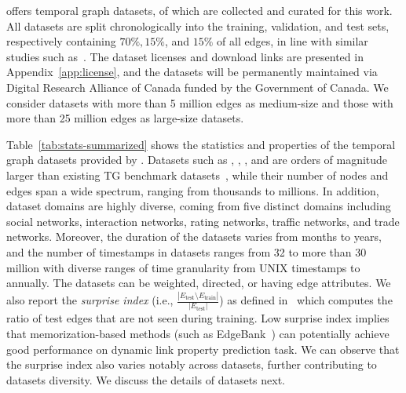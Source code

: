 \name offers  temporal graph datasets,  of which are collected and curated for this work. 
All datasets are split chronologically into the training, validation, and test sets, respectively containing $70\%, 15\%$, and $15\%$ of all edges, in line with similar studies such as~\cite{xu2020inductive,rossi2020temporal,wang2021tcl,jin2022neural,souza2022provably,luoneighborhood}. 
The dataset licenses and download links are presented in Appendix~\ref{app:license}, and the datasets will be permanently maintained via Digital Research Alliance of Canada funded by the Government of Canada. 
We consider datasets with more than 5 million edges as medium-size and those with more than 25 million edges as large-size datasets. 




Table~\ref{tab:stats-summarized} shows the statistics and properties of the temporal graph datasets provided by \name. 
Datasets such as \sky, \reddit, \coin, and \subreddit are orders of magnitude larger than existing TG benchmark datasets~\cite{rossi2020temporal,poursafaeitowards,kumar2019predicting}, while their number of nodes and edges span a wide spectrum, ranging from thousands to millions.   
In addition, \name dataset domains are highly diverse, coming from five distinct domains including social networks, interaction networks, rating networks, traffic networks, and trade networks. 
Moreover, the duration of the datasets varies from months to years, and the number of timestamps in \name datasets ranges from 32 to more than 30 million with diverse ranges of time granularity from UNIX timestamps to annually. 
The datasets can be weighted, directed, or having edge attributes. 
We also report the \emph{surprise index} (i.e., \textit{$\frac{| E_\text{test}\setminus E_\text{train}|} {|E_\text{test}|}$}) as defined in~\cite{poursafaeitowards} which computes the ratio of test edges that are not seen during training. 
Low surprise index implies that memorization-based methods (such as EdgeBank~\cite{poursafaeitowards}) can potentially achieve good performance on dynamic link property prediction task.
We can observe that the surprise index also varies notably across \name datasets, further contributing to datasets diversity. 
We discuss the details of \name datasets next.

